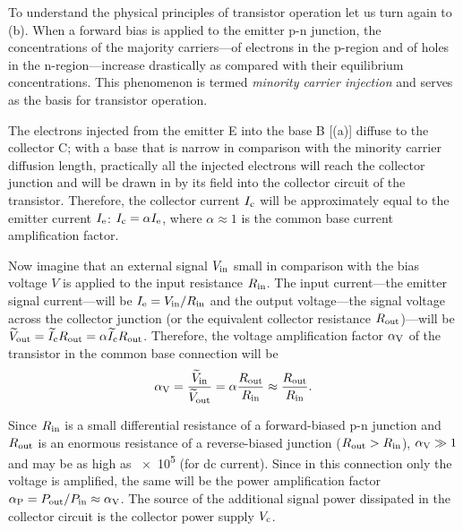 To understand the physical principles of transistor operation let us turn again to (b). When a forward bias is applied to the emitter p-n junction, the concentrations of the majority carriers---of electrons in the p-region and of holes in the n-region---increase drastically as compared with their equilibrium concentrations. This phenomenon is termed \textit{minority carrier injection} and serves
as the basis for transistor operation.

The electrons injected from the emitter E into the base B [(a)] diffuse to the collector C; with a base that is narrow in comparison with the minority carrier diffusion length, practically all the injected electrons will reach the collector junction and will be drawn in by its field into the collector circuit of the transistor. Therefore, the collector current $I_{\text{c}}$ will be approximately equal to the emitter current $I_{\text{e}}$: $I_{\text{c}}=\alpha I_{\text{e}}$, where $\alpha\approx 1$ is the common base current amplification factor.

Now imagine that an external signal $V_{\text{in}}$ small in comparison with the bias voltage $V$ is applied to the input resistance $R_{\text{in}}$. The input current---the emitter signal current---will be $I_{\text{e}}=V_{\text{in}}/R_{\text{in}}$ and the output voltage---the signal voltage across the collector junction (or the equivalent collector resistance $R_{\text{out}}$)---will be $\widetilde{V}_{\text{out}} = \widetilde{I}_{\text{c}}R_{\text{out}}=\alpha\widetilde{I}_{\text{c}}R_{\text{out}}$.
Therefore, the voltage amplification factor $\alpha_{\text{V}}$ of the transistor in the common base connection will be
\begin{equation*}
	\alpha_{\text{V}} = \frac{\widetilde{V}_{\text{in}}}{\widetilde{V}_{\text{out}}} = \alpha \frac{R_{\text{out}}}{R_{\text{in}}} \approx \frac{R_{\text{out}}}{R_{\text{in}}}.
\end{equation*}

Since $R_{\text{in}}$ is a small differential resistance of a forward-biased p-n junction and $R_{\text{out}}$ is an enormous resistance of a reverse-biased junction ($R_{\text{out}}>R_{\text{in}}$), $\alpha_{\text{V}}\gg 1$ and may be as high as \num{e5} (for dc current). Since in this connection only the voltage is amplified, the same will be the power amplification factor $\alpha_{\text{P}}=P_{\text{out}}/P_{\text{in}}\approx\alpha_{\text{V}}$.
The source of the additional signal power dissipated in the collector circuit is the collector power supply $V_{\text{c}}$.

